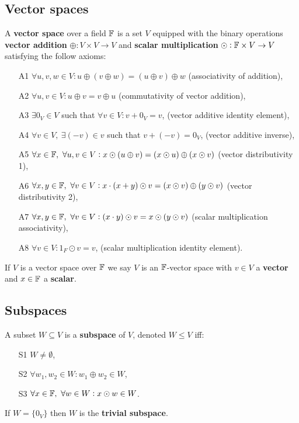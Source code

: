 \subsection{Vector spaces}
\begin{definition}
    A \textbf{vector space} over a field $\mathbb{F}$ is a set $V$ equipped with the binary operations \textbf{vector addition} $\oplus:V\times V\rightarrow V$ and \textbf{scalar multiplication} $\odot:\mathbb{F}\times V\rightarrow V$ satisfying the follow axioms:
    \begin{enumerate}
        \item[A1] $\forall u,v,w \in V: u\oplus(v\oplus w)=(u\oplus v)\oplus w$ (associativity of addition),
        \item[A2] $\forall u,v \in V: u\oplus v=v\oplus u$ (commutativity of vector addition),
        \item[A3] $\exists 0_V \in V$ such that $\forall v\in V: v + 0_V = v$, (vector additive identity element),
        \item[A4] $\forall v\in V, \ \exists (-v)\in v$ such that $v+(-v)=0_V$, (vector additive inverse),

        \item[A5] $\forall x \in \mathbb{F}, \ \forall u,v\in V: x \odot (u\oplus v) =(x\odot u) \oplus (x\odot v)$ (vector distributivity 1),
        \item[A6] $\forall x,y \in \mathbb{F}, \ \forall v\in V: x\cdot (x+y)\odot v =(x\odot v) \oplus (y\odot v)$ (vector distributivity 2),
        \item[A7] $\forall x,y \in \mathbb{F}, \ \forall v\in V: (x\cdot y)\odot v = x\odot (y\odot v)$ (scalar multiplication associativity),
        \item[A8] $\forall v\in V: 1_F\odot v = v$, (scalar multiplication identity element).
    \end{enumerate}
    If $V$ is a vector space over $\mathbb{F}$ we say $V$ is an $\mathbb{F}$-vector space with $v\in V$ a \textbf{vector} and $x\in\mathbb{F}$ a \textbf{scalar}.
\end{definition}

\subsection{Subspaces}
\begin{definition}[Subspace]
    A subset $W\subseteq V$ is a \textbf{subspace} of $V$, denoted $W\leq V$ iff:
    \begin{enumerate}
        \item[S1] $W\neq \emptyset$,
        \item[S2] $\forall w_1, w_2 \in W: w_1 \oplus w_2\in W$,
        \item[S3] $\forall x\in\mathbb{F}, \  \forall w\in W: x\odot w\in W$.
    \end{enumerate}
    If $W=\{0_V\}$ then $W$ is the \textbf{trivial subspace}.
\end{definition}

